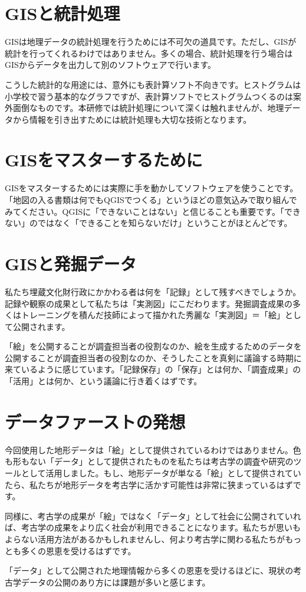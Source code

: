 \documentclass[14Q,twocolumn]{jsarticle}
\begin{document}
\section{GISと統計処理}
GISは地理データの統計処理を行うためには不可欠の道具です。ただし、GISが統計を行ってくれるわけではありません。多くの場合、統計処理を行う場合はGISからデータを出力して別のソフトウェアで行います。

こうした統計的な用途には、意外にも表計算ソフト不向きです。ヒストグラムは小学校で習う基本的なグラフですが、表計算ソフトでヒストグラムつくるのは案外面倒なものです。本研修では統計処理について深くは触れませんが、地理データから情報を引き出すためには統計処理も大切な技術となります。

\section{GISをマスターするために}
GISをマスターするためには実際に手を動かしてソフトウェアを使うことです。「地図の入る書類は何でもQGISでつくる」というほどの意気込みで取り組んでみてください。QGISに「できないことはない」と信じることも重要です。「できない」のではなく「できることを知らないだけ」ということがほとんどです。

\section{GISと発掘データ}
私たち埋蔵文化財行政にかかわる者は何を「記録」として残すべきでしょうか。記録や観察の成果として私たちは「実測図」にこだわります。発掘調査成果の多くはトレーニングを積んだ技師によって描かれた秀麗な「実測図」＝「絵」として公開されます。

「絵」を公開することが調査担当者の役割なのか、絵を生成するためのデータを公開することが調査担当者の役割なのか、そうしたことを真剣に議論する時期に来ているように感じています。「記録保存」の「保存」とは何か、「調査成果」の「活用」とは何か、という議論に行き着くはずです。

\section{データファーストの発想}
今回使用した地形データは「絵」として提供されているわけではありません。色も形もない「データ」として提供されたものを私たちは考古学の調査や研究のツールとして活用しました。もし、地形データが単なる「絵」として提供されていたら、私たちが地形データを考古学に活かす可能性は非常に狭まっているはずです。

同様に、考古学の成果が「絵」ではなく「データ」として社会に公開されていれば、考古学の成果をより広く社会が利用できることになります。私たちが思いもよらない活用方法があるかもしれませんし、何より考古学に関わる私たちがもっとも多くの恩恵を受けるはずです。

「データ」として公開された地理情報から多くの恩恵を受けるほどに、現状の考古学データの公開のあり方には課題が多いと感じます。

\end{document}
